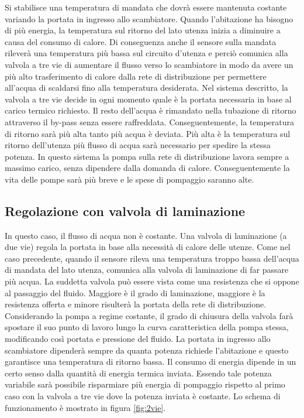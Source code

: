 \documentclass[laurea,oneside,11pt]{USiena_tesiLM}
\begin{document}
Si stabilisce una temperatura di mandata che dovrà essere mantenuta costante variando la portata in ingresso allo scambiatore. Quando l'abitazione ha bisogno di più energia, la temperatura sul ritorno del lato utenza inizia a diminuire a causa del consumo di calore. Di conseguenza anche il sensore sulla mandata rileverà una temperatura più bassa sul circuito d'utenza  e perciò comunica alla valvola a tre vie di aumentare il flusso verso lo scambiatore in modo da avere un più alto trasferimento di calore dalla rete di distribuzione per permettere all'acqua di scaldarsi fino alla temperatura desiderata.
Nel sistema descritto, la valvola a tre vie decide in ogni momento quale è la portata necessaria in base al carico termico richiesto. Il resto dell'acqua è rimandato nella tubazione di ritorno attraverso il by-pass senza essere raffreddata. Conseguentemente, la temperatura di ritorno sarà più alta tanto più acqua è deviata. Più alta è la temperatura sul ritorno dell'utenza     più flusso di acqua sarà necessario per spedire la stessa potenza. In questo sistema la pompa sulla rete di distribuzione lavora sempre a massimo carico, senza dipendere dalla domanda di calore. Conseguentemente la vita delle pompe sarà più breve e le spese di pompaggio saranno alte.

\subsection{Regolazione con valvola di laminazione}
\label{subsec:2vie}
In questo caso, il flusso di acqua non è costante. Una valvola di laminazione (a due vie) regola la portata in base alla necessità di calore delle utenze. 
Come nel caso precedente, quando il sensore rileva una temperatura troppo bassa dell'acqua di mandata del lato utenza, comunica alla valvola di laminazione di far passare più acqua. 
La suddetta valvola può essere vista come una resistenza che si oppone al passaggio del fluido. Maggiore è il grado di laminazione, maggiore è la resistenza offerta e minore risulterà la portata della rete di distribuzione. Considerando la pompa a regime costante, il grado di chiusura della valvola farà spostare il suo punto di lavoro lungo la curva caratteristica della pompa stessa, modificando così portata e pressione del fluido.
La portata in ingresso allo scambiatore dipenderà sempre da quanta potenza richiede l'abitazione e questo garantisce una temperatura di ritorno bassa. 
Il consumo di energia dipende in un certo senso dalla quantità di energia termica inviata. Essendo tale potenza variabile sarà possibile risparmiare più energia di pompaggio rispetto al primo caso con la valvola a tre vie dove la potenza inviata è costante. Lo schema di funzionamento è mostrato in figura \ref{fig:2vie}.
\end{document}
